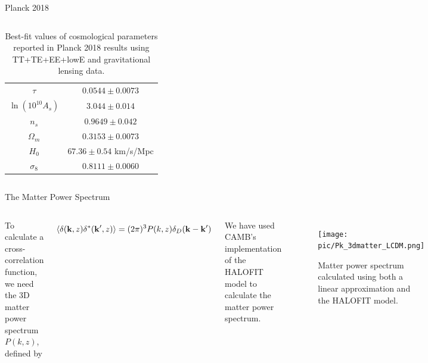 \documentclass[serif, aspectratio=169]{beamer}
\begin{document}
\begin{frame}{Planck 2018}
\begin{columns}
\begin{table}[!htb]
\begin{tabular}{cc}
     $\tau$ & $0.0544\pm 0.0073$\\ 
     $\ln{(10^{10}A_s)}$ & $3.044 \pm 0.014$ \\ 
     $n_s$ & $0.9649 \pm 0.042$ \\ \hline
     $\Omega_m$ & $0.3153 \pm 0.0073$ \\
     $H_0$ & $67.36 \pm 0.54$ km/s/Mpc \\
     $\sigma_8$ & $0.8111 \pm 0.0060$ \\ \hline
    \end{tabular}
    \caption{Best-fit values of cosmological parameters reported in Planck 2018 results using TT+TE+EE+lowE and gravitational lensing data.}
    \label{tab:planck_parameters}
\end{table}
    \end{columns}
\end{frame}

\begin{frame}{The Matter Power Spectrum}
    \begin{columns}
    	To calculate a cross-correlation function, we need the 3D matter power spectrum $P(k,z)$, defined by
    	
    \begin{equation*}
        \left\langle \delta(\mathbf{k},z) \delta^*(\mathbf{k}',z) \right\rangle=(2\pi)^3 P(k,z)\delta_D(\mathbf{k}-\mathbf{k}')
    \end{equation*}
    
        We have used CAMB's implementation of the HALOFIT model to calculate the matter power spectrum.
        
    \begin{figure}
        \centering
        \texttt{[image: pic/Pk\_3dmatter\_LCDM.png]}
        \caption{Matter power spectrum calculated using both a linear approximation and the HALOFIT model.}
        \label{fig:Pk3dmatter}
    \end{figure}
\end{columns}
\end{frame}
\end{document}
